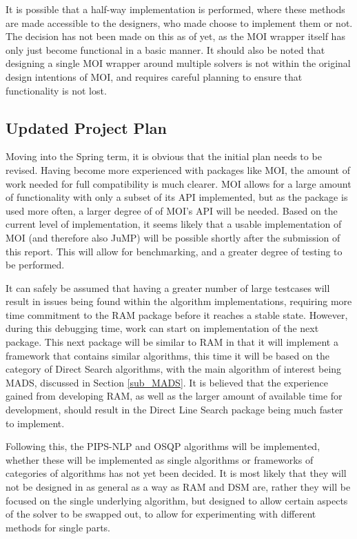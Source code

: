 It is possible that a half-way implementation is performed, where these methods are made accessible to the designers, who made choose to implement them or not. The decision has not been made on this as of yet, as the MOI wrapper itself has only just become functional in a basic manner. It should also be noted that designing a single MOI wrapper around multiple solvers is not within the original design intentions of MOI, and requires careful planning to ensure that functionality is not lost. 

\subsection{Updated Project Plan}
Moving into the Spring term, it is obvious that the initial plan needs to be revised. Having become more experienced with packages like MOI, the amount of work needed for full compatibility is much clearer. MOI allows for a large amount of functionality with only a subset of its API implemented, but as the package is used more often, a larger degree of of MOI's API will be needed. Based on the current level of implementation, it seems likely that a usable implementation of MOI (and therefore also JuMP) will be possible shortly after the submission of this report. This will allow for benchmarking, and a greater degree of testing to be performed. 

It can safely be assumed that having a greater number of large testcases will result in issues being found within the algorithm implementations, requiring more time commitment to the RAM package before it reaches a stable state. However, during this debugging time, work can start on implementation of the next package. 
This next package will be similar to RAM in that it will implement a framework that contains similar algorithms, this time it will be based on the category of Direct Search algorithms, with the main algorithm of interest being MADS, discussed in Section \ref{sub_MADS}. It is believed that the experience gained from developing RAM, as well as the larger amount of available time for development, should result in the Direct Line Search package being much faster to implement. 

Following this, the PIPS-NLP and OSQP algorithms will be implemented, whether these will be implemented as single algorithms or frameworks of categories of algorithms has not yet been decided. It is most likely that they will not be designed in as general as a way as RAM and DSM are, rather they will be focused on the single underlying algorithm, but designed to allow certain aspects of the solver to be swapped out, to allow for experimenting with different methods for single parts. 


